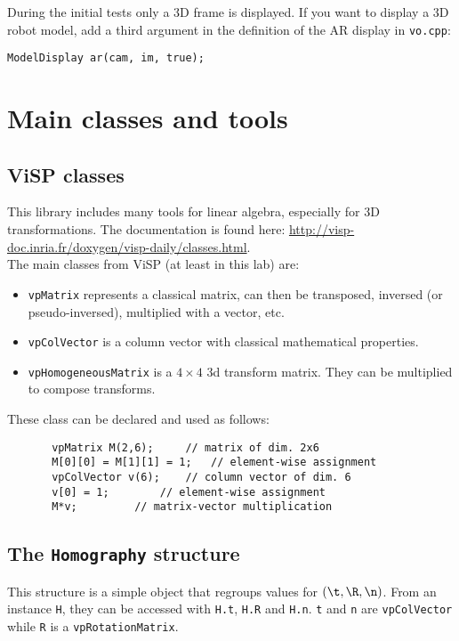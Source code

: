 \documentclass{ecnreport}
\begin{document}
During the initial tests only a 3D frame is displayed. If you want to display a 3D robot model, add a third argument in 
the definition of the AR display in \texttt{vo.cpp}:
\begin{center}
\texttt{ModelDisplay ar(cam, im, true);}  
\end{center}


\appendix
\section{Main classes and tools}\label{sec:classes}

\subsection{ViSP classes}

This library includes many tools for linear algebra, especially for 3D transformations. 
The documentation is found here: \url{http://visp-doc.inria.fr/doxygen/visp-daily/classes.html}.\\
The main classes from ViSP (at least in this lab) are:
\begin{itemize}
\item \texttt{vpMatrix} represents a classical matrix, can then be transposed, inversed (or pseudo-inversed), multiplied with a vector, etc.
\item \texttt{vpColVector} is a column vector with classical mathematical properties.
\item \texttt{vpHomogeneousMatrix} is a $4\times 4$ 3d transform matrix. They can be multiplied to compose transforms.
\end{itemize}
These class can be declared and used as follows:
\begin{center}\cppstyle
\begin{lstlisting}
       vpMatrix M(2,6); 	// matrix of dim. 2x6
       M[0][0] = M[1][1] = 1;	// element-wise assignment
       vpColVector v(6);	// column vector of dim. 6
       v[0] = 1;		// element-wise assignment
       M*v;			// matrix-vector multiplication
\end{lstlisting}
\end{center}

\subsection{The \texttt{Homography} structure}
\label{sec:homog}

This structure is a simple object that regroups values for $(\t,\R,\n)$. From an instance \texttt{H}, they can be accessed with \texttt{H.t}, 
\texttt{H.R} and \texttt{H.n}. \texttt{t} and \texttt{n} are \texttt{vpColVector} while \texttt{R} is a \texttt{vpRotationMatrix}.
\end{document}
